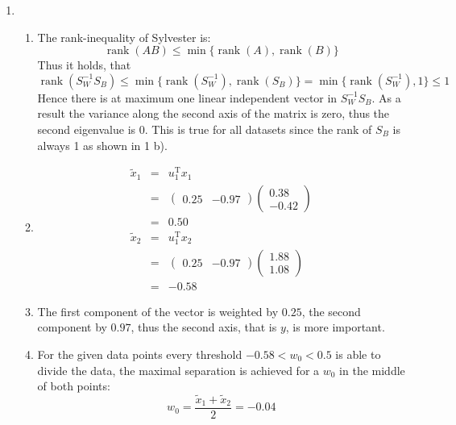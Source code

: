 \documentclass[DIN, pagenumber=false, fontsize=11pt, parskip=half]{scrartcl}
\DeclareMathOperator{\rank}{rank}
\begin{document}
\begin{enumerate}
        \item 
            \begin{enumerate}[label=\alph*)]
                \item
                    The rank-inequality of Sylvester is:
                    \begin{equation*}
                        \rank(A B) \leq \min \{ \rank(A), \rank(B) \}
                    \end{equation*}
                    Thus it holds, that
                    \begin{equation*}
                        \rank(S_W^{-1} S_B) \leq \min \{\rank(S_W^{-1}), \rank(S_B)\} 
                            = \min \{\rank(S_W^{-1}), 1\} \leq 1
                    \end{equation*}
                    Hence there is at maximum one linear independent vector in $S_W^{-1} S_B$.
                    As a result the variance along the second axis of the matrix is zero,
                    thus the second eigenvalue is 0. This is true for all datasets since the rank
                    of $S_B$ is always 1 as shown in 1 b).
                \item
                    \begin{eqnarray*}
                        \tilde{x}_1 &=& u_1^\text{T} x_1 \\
                            &=& \begin{pmatrix} 0.25 & -0.97 \end{pmatrix}
                                \begin{pmatrix} 0.38 \\ -0.42 \end{pmatrix} \\
                            &=& 0.50 \\
                        \tilde{x}_2 &=& u_1^\text{T} x_2 \\
                            &=& \begin{pmatrix} 0.25 & -0.97 \end{pmatrix}
                                \begin{pmatrix} 1.88 \\ 1.08 \end{pmatrix} \\
                            &=& -0.58
                    \end{eqnarray*}
                \item The first component of the vector is weighted by $0.25$, the second
                    component by $0.97$, thus the second axis, that is $y$, is more important.
                \item For the given data points every threshold $-0.58 < w_0 < 0.5$
                    is able to divide the data, the maximal separation is achieved
                    for a $w_0$ in the middle of both points:
                    \begin{equation*}
                        w_0 = \frac{\tilde{x}_1 + \tilde{x}_2}{2} = -0.04
                    \end{equation*}
            \end{enumerate}
    \end{enumerate}
\end{document}
